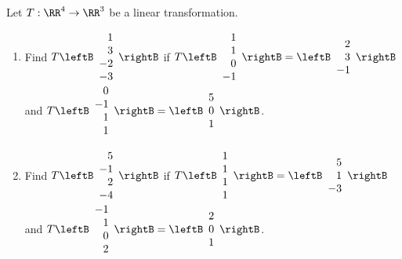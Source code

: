 \begin{multicols}{2}
\begin{ex}
Let $T : \RR^4 \to \RR^3$ be a linear transformation.
{\footnotesize
\begin{enumerate}[label={\alph*.}]
\item Find $T \leftB \begin{array}{r}
1 \\
3 \\
-2 \\
-3
\end{array} \rightB$
 if $T \leftB \begin{array}{r}
 1 \\
 1 \\
 0 \\
 -1
 \end{array} \rightB = \leftB \begin{array}{r}
 2 \\
 3 \\
 -1
 \end{array} \rightB$
  \\and $T \leftB \begin{array}{r}
 0 \\
 -1 \\
 1 \\
 1
 \end{array} \rightB = \leftB \begin{array}{r}
 5 \\
 0 \\
 1
 \end{array} \rightB$.

\item Find $T \leftB \begin{array}{r}
5 \\
-1 \\
2 \\
-4
\end{array} \rightB$
if $T \leftB \begin{array}{r}
1 \\
1 \\
1 \\
1
\end{array} \rightB = \leftB \begin{array}{r}
5 \\
1 \\
-3
\end{array} \rightB$
\\and $T \leftB \begin{array}{r}
-1 \\
1 \\
0 \\
2
\end{array} \rightB = \leftB \begin{array}{r}
2 \\
0 \\
1
\end{array} \rightB$.


\end{enumerate}}
\end{ex}
\end{multicols}
